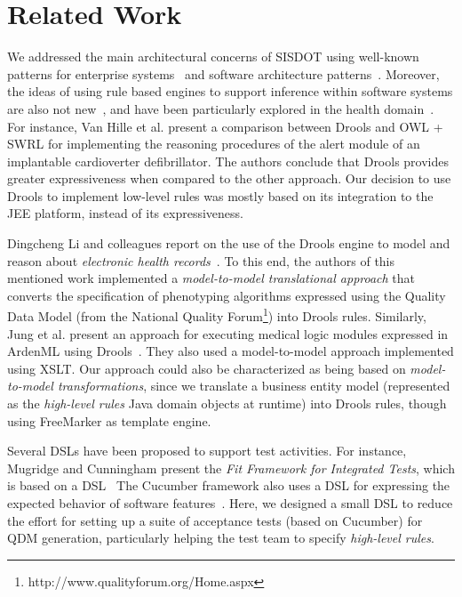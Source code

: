 \documentclass{bmcart}
\newcommand{\callers}{\emph{high-level rules}\xspace}
\begin{document}
\section*{Related Work}
\label{sec:related}

We addressed the main architectural concerns of SISDOT using well-known patterns for enterprise systems~\cite{enterprise-patterns:book} and software architecture patterns~\cite{pattern-oriented:book}. Moreover, the ideas of using rule based engines to support inference within software systems are also not new~\cite{ORDONEZ2016353,li2012modeling}, and have been particularly explored in the health domain~\cite{mantas2012comparing,li2012modeling,jung2011executing}. For instance, Van Hille et al. present a comparison between Drools and OWL + SWRL for implementing the reasoning procedures of the alert module of an implantable
cardioverter defibrillator. The authors conclude that Drools provides greater expressiveness when compared to the other approach. Our decision to use Drools to implement low-level rules was mostly based on its integration to the JEE platform, instead of its expressiveness.

Dingcheng Li and colleagues report on the use of the Drools engine to model and reason about \emph{electronic health records}~\cite{li2012modeling}. To this end, the authors of this mentioned work implemented a \emph{model-to-model translational approach} that converts the specification of phenotyping algorithms expressed using the Quality Data Model (from the National Quality Forum\footnote{http://www.qualityforum.org/Home.aspx}) into Drools rules. Similarly, Jung et al. present an approach for executing medical logic modules expressed in ArdenML using Drools~\cite{jung2011executing}. They also used a model-to-model approach implemented using XSLT. Our approach could also be characterized as being based on \emph{model-to-model transformations}, since we translate a business entity model (represented as the \callers Java domain objects at runtime) into Drools rules, though using FreeMarker as template engine.

Several DSLs have been proposed to support test activities. For instance, Mugridge and Cunningham present the \emph{Fit Framework for Integrated Tests}, which is based on a DSL~\cite{Mugridge:2005:FDS:1051337} The Cucumber framework also uses a DSL for expressing the expected behavior of software features~\cite{Wynne:2012:CBB:2331446}. Here, we designed a small DSL to reduce the effort for setting up a suite of acceptance tests (based on Cucumber) for QDM generation, particularly helping the test team to specify \callers. 
\end{document}
